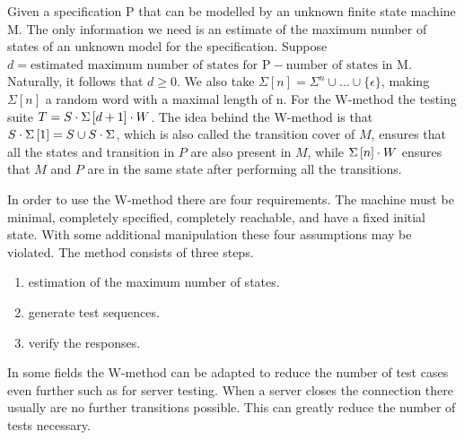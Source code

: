 \documentclass[multi,crop=false,class=article]{standalone}
\begin{document}
Given a specification P that can be modelled by an unknown finite
state machine M.
The only information we need is an estimate of the maximum number of
states of an unknown model for the specification.
Suppose $d = \text{estimated maximum number of states for P}
- \text{number of states in M}$.
Naturally, it follows that $d \geq 0$.
We also take $\Sigma \left[ n \right] = \Sigma^{n} \cup \dots \cup \lbrace \epsilon \rbrace$,
making $\Sigma\left[ n \right]$ a random word with a maximal length of n.
For the W-method the testing suite $T = S \cdot \Sigma\left[ d + 1 \right]  \cdot W$.
The idea behind the W-method is that $S \cdot \Sigma\left[ 1 \right]  = S \cup S
\cdot \Sigma$, which is also called the transition cover of $M$, ensures that all the
states and transition in $P$ are also present in $M$, while
$\Sigma\left[ n \right] \cdot W$ ensures that $M$ and $P$ are in the same state after
performing all the transitions.

In order to use the W-method there are four requirements.
The machine must be minimal, completely specified, completely reachable, 
and have a fixed initial state.
With some additional manipulation these four assumptions may be violated.
The method consists of three steps.
\begin{enumerate}
\item estimation of the maximum number of states.
\item generate test sequences.
\item verify the responses.
\end{enumerate}

In some fields the W-method can be adapted to reduce the number of test
cases even further such as for server testing.
When a server closes the connection there usually are no further
transitions possible.
This can greatly reduce the number of tests necessary\cite{deRuiter15}.
\end{document}
